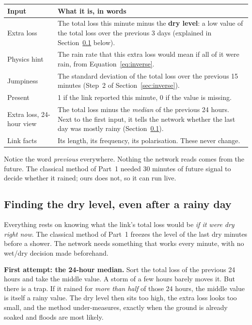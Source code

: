 \begin{center}\small
\begin{tabular}{p{3.6cm}p{10.4cm}}
\toprule
Input & What it is, in words \\
\midrule
Extra loss & The total loss this minute minus the \textbf{dry level}: a low value of the total loss over the previous
3 days (explained in Section~\ref{sec:drylevel} below). \\
Physics hint & The rain rate that this extra loss would mean if all of it were rain, from Equation~\ref{eq:inverse}. \\
Jumpiness & The standard deviation of the total loss over the previous 15 minutes (Step~2 of Section~\ref{sec:inverse}). \\
Present & 1 if the link reported this minute, 0 if the value is missing. \\
Extra loss, 24-hour view & The total loss minus the \emph{median} of the previous 24 hours. Next to the first input, it tells
the network whether the last day was mostly rainy (Section~\ref{sec:drylevel}). \\
\midrule
Link facts & Its length, its frequency, its polarisation. These never change. \\
\bottomrule
\end{tabular}
\end{center}

Notice the word \emph{previous} everywhere. Nothing the network reads comes from the future. The classical method of
Part~1 needed 30 minutes of future signal to decide whether it rained; ours does not, so it can run live.

\subsection{Finding the dry level, even after a rainy day}
\label{sec:drylevel}
Everything rests on knowing what the link's total loss would be \emph{if it were dry right now}. The classical method
of Part~1 freezes the level of the last dry minutes before a shower. The network needs something that works every
minute, with no wet/dry decision made beforehand.

\textbf{First attempt: the 24-hour median.} Sort the total loss of the previous 24 hours and take the middle value. A
storm of a few hours barely moves it. But there is a trap. If it rained for \emph{more than half} of those 24 hours, the
middle value is itself a rainy value. The dry level then sits too high, the extra loss looks too small, and the method
under-measures, exactly when the ground is already soaked and floods are most likely.


